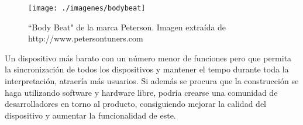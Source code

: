 \begin{figure}[htb]
\centering
\texttt{[image: ./imagenes/bodybeat]}
\caption{\scriptsize{``Body Beat" de la marca Peterson. Imagen extraída de
http://www.petersontuners.com} \label{fig:modeladoconceptual}}
\end{figure}

Un dispositivo más barato con un número menor de funciones pero que permita la sincronización de todos
los dispositivos y mantener el tempo durante toda la interpretación, atraería más usuarios. Si además
se procura que la construcción se haga utilizando software y hardware libre, podría crearse una comunidad
de desarrolladores en torno al producto, consiguiendo mejorar la calidad del dispositivo y aumentar la funcionalidad
de este.\\
